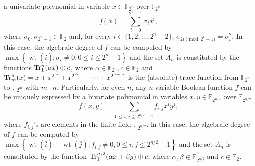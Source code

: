 \documentclass[preprint,10pt]{elsarticle}
\newcommand{\F}{\mathbb{F}}
\newcommand{\0}{\textbf{0}}
\newcommand{\1}{\textbf{1}}
\newcommand{\wt}{\operatorname{wt}}
\theoremstyle{plain}
\begin{document}
    a univariate polynomial in variable $x\in\F_{2^n}$ over $\F_{2^n}$
    \[f(x) = \sum_{i=0}^{2^n-1}\sigma_ix^i,\]
    where $\sigma_0,\sigma_{2^n-1}\in\F_2$ and, for every $i\in\{1,2,\dots,2^n-2\}$, $\sigma_{2i\pmod{2^n-1}}=\sigma_i^2$.
    In this case, the algebraic degree of $f$ can be computed by $\max\left\{ \wt(\overline{i}) : \sigma_i\ne 0, 0\le i\le 2^n-1 \right\}$ and the set $A_n$ is constituted by the functions $\Tr_1^n(\alpha x)\oplus c$, where $\alpha\in\F_{2^n}, c\in\F_2$ and $\Tr_m^n(x)=x+x^{2^m}+x^{2^{2m}}+\cdots+x^{2^{n-m}}$ is the (absolute) trace function from $\F_{2^n}$ to $\F_{2^m}$ with $m\mid n$.
    Particularly, for even $n$, any $n$-variable Boolean function $f$ can be uniquely expressed by a bivariate polynomial in variables $x,y\in\F_{2^{n/2}}$ over $\F_{2^{n/2}}$
    \[f(x,y)=\sum_{0\le i,j\le 2^{n/2}-1}f_{i,j}x^iy^j,\]
    where $f_{i,j}$'s are elements in the finite field $\F_{2^{n/2}}$.
    In this case, the algebraic degree of $f$ can be computed by $\max\left\{ \wt(\overline{i})+\wt(\overline{j}) : f_{i,j}\ne 0, 0\le i,j\le 2^{n/2}-1 \right\}$ and the set $A_n$ is constituted by the function $\Tr_1^{n/2}(\alpha x+\beta y)\oplus c$, where $\alpha,\beta\in\F_{2^{n/2}}$ and $c\in\F_2$.
\end{document}
